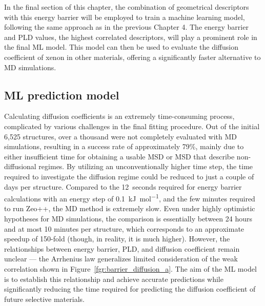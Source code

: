 \documentclass[main]{subfiles}
\begin{document}
In the final section of this chapter, the combination of geometrical descriptors with this energy barrier will be employed to train a machine learning model, following the same approach as in the previous Chapter 4. The energy barrier and PLD values, the highest correlated descriptors, will play a prominent role in the final ML model. This model can then be used to evaluate the diffusion coefficient of xenon in other materials, offering a significantly faster alternative to MD simulations.

\subsection{ML prediction model}

Calculating diffusion coefficients is an extremely time-consuming process, complicated by various challenges in the final fitting procedure. Out of the initial 6,525 structures, over a thousand were not completely evaluated with MD simulations, resulting in a success rate of approximately 79\%, mainly due to either insufficient time for obtaining a usable MSD or MSD that describe non-diffusional regimes. By utilizing an unconventionally higher time step, the time required to investigate the diffusion regime could be reduced to just a couple of days per structure. Compared to the \SI{12}{seconds} required for energy barrier calculations with an energy step of \SI{0.1}{\kJ\per\mol}, and the few minutes required to run Zeo++, the MD method is extremely slow. Even under highly optimistic hypotheses for MD simulations, the comparison is essentially between 24 hours and at most 10 minutes per structure, which corresponds to an approximate speedup of 150-fold (though, in reality, it is much higher). However, the relationships between energy barrier, PLD, and diffusion coefficient remain unclear --- the Arrhenius law generalizes limited consideration of the weak correlation shown in Figure~\ref{fgr:barrier_diffusion_a}. The aim of the ML model is to establish this relationship and achieve accurate predictions while significantly reducing the time required for predicting the diffusion coefficient of future selective materials.
\end{document}
